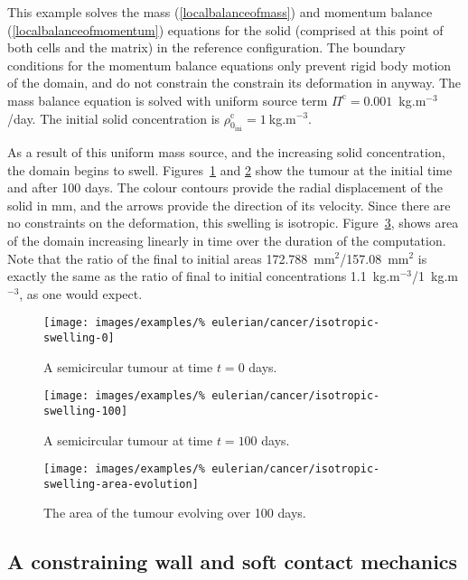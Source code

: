 This example solves the mass (\ref{localbalanceofmass}) and momentum
balance (\ref{localbalanceofmomentum}) equations for the solid
(comprised at this point of both cells and the matrix) in the
reference configuration. The boundary conditions for the momentum
balance equations only prevent rigid body motion of the domain, and do
not constrain the constrain its deformation in anyway. The mass
balance equation is solved with uniform source term
$\Pi^{\mathrm{c}}=0.001$~kg.m$^{-3}$/day. The initial solid
concentration is $\rho_{0_{\mathrm{ini}}}^{\mathrm{c}}=1~$kg.m$^{-3}$.

As a result of this uniform mass source, and the increasing solid
concentration, the domain begins to
swell. Figures~\ref{tumour-isotropic-swelling-0} and
\ref{tumour-isotropic-swelling-100} show the tumour at the
initial time and after 100 days. The colour contours provide the
radial displacement of the solid in mm, and the arrows provide the
direction of its velocity. Since there are no constraints on the
deformation, this swelling is
isotropic. Figure~\ref{tumour-isotropic-area-evolution}, shows area of
the domain increasing linearly in time over the duration of the
computation. Note that the ratio of the final to initial areas
172.788~mm$^2$/157.08~mm$^2$ is exactly the same as the ratio of final
to initial concentrations 1.1~kg.m$^{-3}$/1~kg.m$^{-3}$, as one would
expect.

\begin{figure}[!hptb]
\centering
\texttt{[image: images/examples/\%
eulerian/cancer/isotropic-swelling-0]}
\caption{A semicircular tumour at time $t=0$ days.}
\label{tumour-isotropic-swelling-0}
\end{figure}

\begin{figure}[!hptb]
\centering
\texttt{[image: images/examples/\%
eulerian/cancer/isotropic-swelling-100]}
\caption{A semicircular tumour at time $t=100$ days.}
\label{tumour-isotropic-swelling-100}
\end{figure}

\begin{figure}[!hptb]
\centering
\texttt{[image: images/examples/\%
eulerian/cancer/isotropic-swelling-area-evolution]}
\caption{The area of the tumour evolving over 100 days.}
\label{tumour-isotropic-area-evolution}
\end{figure}

\subsection{A constraining wall and soft contact mechanics}
\label{wall-constraint}

